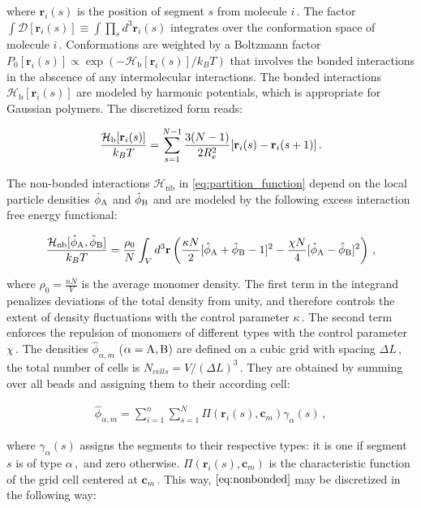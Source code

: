 \documentclass[bachelor,       %
               twoside,        %
               BCOR10mm,       %
               ngerman, english %
               ]{GAUBM}
\begin{document}
where $\mathbf r_i(s)$ is the position of segment $s$ from molecule $i\,.$ The factor $\int\mathcal{D}[\mathbf r_i(s)]\equiv \int\prod_sd^3\mathbf r_i(s)$ integrates over the conformation space of molecule $i\,.$ Conformations are weighted by a Boltzmann factor $P_0[\mathbf r_i(s)]\propto\exp\left(-\mathcal H_{\text{b}}[\mathbf r_i(s)]/k_BT\right)$ that involves the bonded interactions in the abscence of any intermolecular interactions. The bonded interactions $\mathcal H_{\text{b}}[\mathbf r_i(s)]$ are modeled by harmonic potentials, which is appropriate for Gaussian polymers. The discretized form reads:

\begin{align}
    \frac{\mathcal H_\text b[\mathbf r_i(s)]}{k_BT}=\sum_{s=1}^{N-1}\frac{3(N-1)}{2R_e^2}[\mathbf r_i(s)-\mathbf r_i(s+1)]\,.
\end{align}

The non-bonded interactions $\mathcal H_\text{nb}$ in \eqref{eq:partition_function} depend on the local particle densities $\hat\phi_\text A$ and $\hat\phi_\text B$ and are modeled by the following excess interaction free energy functional:

\begin{align}
    \frac{\mathcal H_\text{nb}[\hat\phi_\text A,\hat\phi_\text B]}{k_BT}=\frac{\rho_0}{N}\int_Vd^3\mathbf r\left(\frac{\kappa N}{2}[\hat\phi_\text A+\hat\phi_\text B-1]^2-\frac{\chi N}{4}[\hat\phi_\text A-\hat\phi_\text B]^2\right)\,,
    \label{eq:nonbonded}
\end{align}

where $\rho_0=\frac{nN}{V}$ is the average monomer density. The first term in the integrand penalizes deviations of the total density from unity, and therefore controls the extent of density fluctuations with the control parameter $\kappa\,.$ The second term enforces the repulsion of monomers of different types with the control parameter $\chi\,.$ The densities $\hat\phi_{\alpha,m}$ ($\alpha=\text A,\text B$) are defined on a cubic grid with spacing $\Delta L\,,$ the total number of cells is $N_{cells}=V/(\Delta L)^3\,.$ They are obtained by summing over all beads and assigning them to their according cell:

\begin{align}
    \hat\phi_{\alpha,m}=\sum_{i=1}^n\sum_{s=1}^N\Pi(\mathbf r_i(s),\mathbf c_m)\gamma_\alpha(s)\,,
\end{align}

where $\gamma_\alpha(s)$ assigns the segments to their respective types: it is one if segment $s$ is of type $\alpha\,,$ and zero otherwise. $\Pi(\mathbf r_i(s),\mathbf c_m)$ is the characteristic function of the grid cell centered at $\mathbf c_m\,.$ This way, $\eqref{eq:nonbonded}$ may be discretized in the following way:
\end{document}
